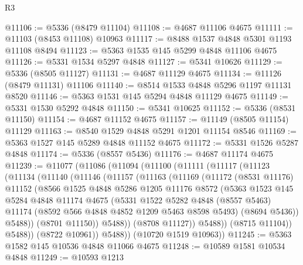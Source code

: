 \begin{lexlean}{R3}
\begin{coremodule}
@11106 := @5336 (@8479 @11104)
@11108 := @4687 @11106 @4675
@11111 := @11103 (@8453 @11108) @10963
@11117 := @8488 @1537 @4848 @5301 @1193 @11108 @8494
@11123 := @5363 @1535 @145 @5299 @4848 @11106 @4675
@11126 := @5331 @1534 @5297 @4848
@11127 := @5341 @10626
@11129 := @5336 (@8505 @11127)
@11131 := @4687 @11129 @4675
@11134 := @11126 (@8479 @11131) @11106
@11140 := @8514 @1533 @4848 @5296 @1197 @11131 @8520
@11146 := @5363 @1531 @145 @5294 @4848 @11129 @4675
@11149 := @5331 @1530 @5292 @4848
@11150 := @5341 @10625
@11152 := @5336 (@8531 @11150)
@11154 := @4687 @11152 @4675
@11157 := @11149 (@8505 @11154) @11129
@11163 := @8540 @1529 @4848 @5291 @1201 @11154 @8546
@11169 := @5363 @1527 @145 @5289 @4848 @11152 @4675
@11172 := @5331 @1526 @5287 @4848
@11174 := @5336 (@8557 @5436)
@11176 := @4687 @11174 @4675
@11239 := @11077
    (@11086
      (@11094
        (@11100
          (@11111
            (@11117
              (@11123
                (@11134
                  (@11140
                    (@11146
                      (@11157
                        (@11163
                          (@11169
                            (@11172
                              (@8531 @11176)
                              @11152
                              (@8566
                                @1525
                                @4848
                                @5286
                                @1205
                                @11176
                                @8572
                                (@5363
                                  @1523
                                  @145
                                  @5284
                                  @4848
                                  @11174
                                  @4675
                                  (@5331
                                    @1522
                                    @5282
                                    @4848
                                    (@8557 @5463)
                                    @11174
                                    (@8592 @566 @4848 @4852 @1209 @5463 @8598 @5493)
                                    (@8694 @5436))
                                  @5488))
                              (@8701 @11150))
                            @5488))
                        (@8708 @11127))
                      @5488))
                  (@8715 @11104))
                @5488))
            (@8722 @10961))
          @5488))
      (@10720 @1519 @10963))
@11245 := @5363 @1582 @145 @10536 @4848 @11066 @4675
@11248 := @10589 @1581 @10534 @4848
@11249 := @10593 @1213

\end{coremodule}
\end{lexlean}
